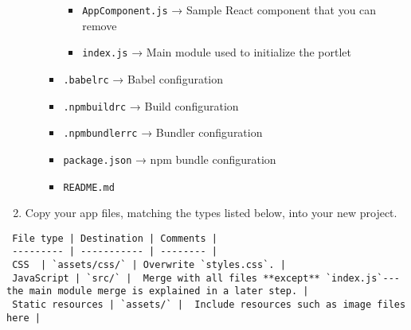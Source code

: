 \begin{enumerate}
\begin{itemize}
\begin{itemize}
      \begin{itemize}
      \tightlist
      \item
        \texttt{AppComponent.js} → Sample React component that you can
        remove
      \item
        \texttt{index.js} → Main module used to initialize the portlet
      \end{itemize}
    \item
      \texttt{.babelrc} → Babel configuration
    \item
      \texttt{.npmbuildrc} → Build configuration
    \item
      \texttt{.npmbundlerrc} → Bundler configuration
    \item
      \texttt{package.json} → npm bundle configuration
    \item
      \texttt{README.md}
    \end{itemize}
  \end{itemize}
\item
  Copy your app files, matching the types listed below, into your new
  project.
\end{enumerate}

\noindent\hrulefill

\begin{verbatim}
 File type | Destination | Comments |
 --------- | ----------- | -------- |
 CSS  | `assets/css/` | Overwrite `styles.css`. |
 JavaScript | `src/` |  Merge with all files **except** `index.js`---the main module merge is explained in a later step. |
 Static resources | `assets/` |  Include resources such as image files here |
\end{verbatim}

\noindent\hrulefill


